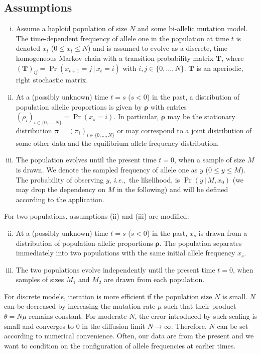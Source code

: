 \documentclass[preprint]{elsarticle}
\newcommand{\bs}[1]{\ensuremath{\boldsymbol{#1}}}
\newcommand\given{{\,|\,}}
\newcommand\ie{{\it i.e.,}}
\newcommand\x[1]{\ensuremath{x_{#1}}}
\newcommand\y{\ensuremath{y}}
\newcommand\s{\ensuremath{s}}
\begin{document}
\subsection{Assumptions}\label{section:assumptions}
\begin{enumerate}[(i)]
\item Assume a haploid population of size $N$ and some bi-allelic mutation model. The time-dependent frequency of allele one in the population at time $t$ is denoted $\x{t}$ ($0 \le \x{t} \le N$) and is assumed to evolve as a discrete, time-homogeneous Markov chain with a transition probability matrix $\mathbf{T}$, where $(\mathbf{T})_{ij}=\Pr(\x{t+1}=j \given \x{t}=i)$ with $i,j \in \{0, \ldots, N\}$. $\mathbf{T}$ is an aperiodic, right stochastic matrix.
\item At a (possibly unknown) time $t=\s$ ($\s<0$) in the past, a distribution of population allelic proportions is given by $\bs{\rho}$ with entries $(\rho_{i})_{i \in \{0, \ldots, N\}} = \Pr(\x{\s}=i)$.  In particular, $\bs{\rho}$ may be the stationary distribution $\bs{\pi}=(\pi_i)_{i \in \{0, \ldots, N\}}$ or may correspond to a joint distribution of some other data and the equilibrium allele frequency distribution. 
\item The population evolves until the present time $t=0$, when a sample of size $M$ is drawn.  We denote the sampled frequency of allele one as $\y$ ($0 \le \y \le M$). The probability of observing $\y$, \ie\ the likelihood, is $\Pr(\y \given M, \x{0})$ (we may drop the dependency on $M$ in the following) and will be defined according to the application.
\end{enumerate}

For two populations, assumptions (ii) and (iii) are modified:
\begin{enumerate}[(i)]
\setcounter{enumi}{1}
\item At a (possibly unknown) time $t=\s$ ($\s<0$) in the past, $\x{\s}$ is drawn from a distribution of population allelic proportions $\bs{\rho}$. The population separates immediately into two populations with the same initial allele frequency $\x{\s}$. 
\item The two populations evolve independently until the present time $t=0$, when samples of sizes $M_1$ and $M_2$ are drawn from each population.
\end{enumerate}

For discrete models, iteration is more efficient if the population size $N$ is small. $N$ can be decreased by increasing the mutation rate $\mu$ such that their product $\theta=N \mu$ remains constant. For moderate $N$, the error introduced by such scaling is small and converges to $0$ in the diffusion limit $N \to \infty$. Therefore, $N$ can be set according to numerical convenience. Often, our data are from the present and we want to condition on the configuration of allele frequencies at earlier times.
\end{document}
